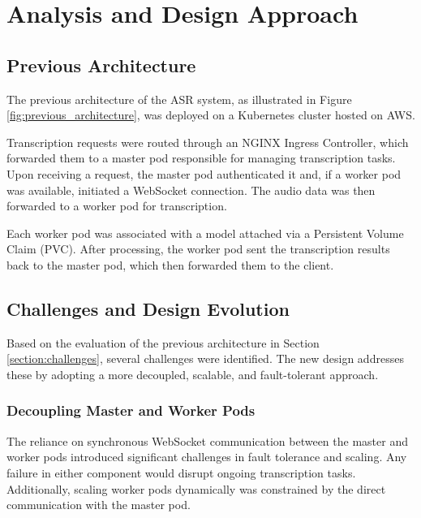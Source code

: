 \chapter{Analysis and Design Approach} \label{chapter:analysis_and_design}
\section{Previous Architecture}
The previous architecture of the ASR system, as illustrated in Figure \ref{fig:previous_architecture}, was deployed on a Kubernetes cluster hosted on AWS.

Transcription requests were routed through an NGINX Ingress Controller, which forwarded them to a master pod responsible for managing transcription tasks. Upon receiving a request, the master pod authenticated it and, if a worker pod was available, initiated a WebSocket connection. The audio data was then forwarded to a worker pod for transcription.

Each worker pod was associated with a model attached via a Persistent Volume Claim (PVC). After processing, the worker pod sent the transcription results back to the master pod, which then forwarded them to the client.

\section{Challenges and Design Evolution}
Based on the evaluation of the previous architecture in Section \ref{section:challenges}, several challenges were identified. The new design addresses these by adopting a more decoupled, scalable, and fault-tolerant approach.

\subsection{Decoupling Master and Worker Pods}
The reliance on synchronous WebSocket communication between the master and worker pods introduced significant challenges in fault tolerance and scaling. Any failure in either component would disrupt ongoing transcription tasks. Additionally, scaling worker pods dynamically was constrained by the direct communication with the master pod.

